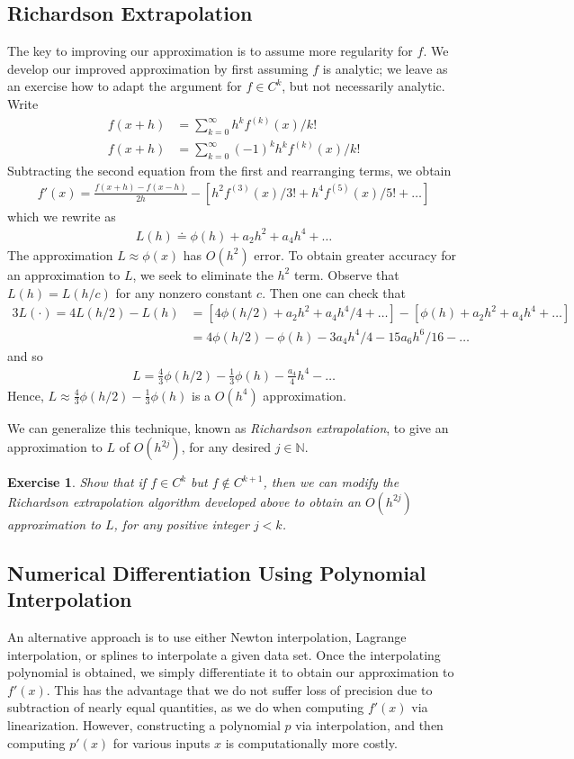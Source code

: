\documentclass[12pt,reqno]{amsart}
\numberwithin{equation}{section}  %
\newtheorem{exercise}{Exercise}
\begin{document}
\subsection{Richardson Extrapolation}
The key to improving our approximation is to assume more regularity for $f$.
We develop our improved approximation by first assuming $f$ is analytic; we leave
as an exercise how to adapt the argument for $f \in C^k$, but not necessarily
analytic. Write
\begin{align*}
f(x+h) &= \sum_{k=0}^\infty h^k f^{(k)}(x)/k!
\\
f(x+h) &= \sum_{k=0}^\infty (-1)^{k}h^k f^{(k)}(x)/k!
\end{align*}
Subtracting the second equation from the first and rearranging terms, we obtain 
\begin{align*}
f'(x) = \frac{f(x+h) - f(x-h)}{2h} - \left[ h^2f^{(3)}(x)/3! + h^4f^{(5)}(x)/5! + \ldots \right]
\end{align*}
which we rewrite as
\begin{align*}
L(h) \doteq \phi(h) + a_2 h^2 + a_4 h^4 + \ldots
\end{align*}
The approximation $L \approx \phi(x)$ has $O(h^2)$ error. To obtain greater
accuracy for an approximation to $L$, we seek to eliminate the $h^2$ term.
Observe that $L(h) = L(h/c)$ for any nonzero constant $c$. Then one can check
that
\begin{align*}
3L(\cdot) = 4L(h/2) - L(h) & = [4\phi(h/2) + a_2 h^2 + a_4 h^4/4 + \ldots]
 - [ \phi(h) + a_2 h^2 + a_4 h^4 + \ldots]
 \\
 & = 4 \phi(h/2) - \phi(h) - 3a_4 h^4/4 - 15a_6h^6/16 -\ldots 
\end{align*}
and so
\begin{align*}
L = \frac{4}{3}\phi(h/2) - \frac{1}{3}\phi(h) - \frac{a_4}{4}h^4 - \ldots
\end{align*}
Hence, $L \approx \frac{4}{3}\phi(h/2) - \frac{1}{3}\phi(h) $
is a $O(h^4)$ approximation. 

We can generalize this technique, known as \emph{Richardson extrapolation},
to give an approximation to $L$ of
$O(h^{2j})$, for any desired $j \in \mathbb{N}$. 
\begin{exercise}
Show that if $f \in C^k$ but $f \not \in C^{k+1}$, then we can modify
the Richardson extrapolation algorithm developed above to obtain an 
$O(h^{2j})$ approximation to $L$, for any positive integer $j < k$.
\end{exercise}
\subsection{Numerical Differentiation Using Polynomial Interpolation}
An alternative approach is to use either Newton interpolation,
Lagrange interpolation, or splines to interpolate a given data set.
Once the interpolating polynomial is obtained, we simply differentiate it
to obtain our approximation to $f'(x)$. This has the advantage
that we do not suffer loss of precision due to subtraction of nearly equal
quantities, as we do when computing $f'(x)$ via linearization. However,
constructing a polynomial $p$ via interpolation, and then computing $p'(x)$
for various inputs $x$ is computationally more costly. 
\end{document}
